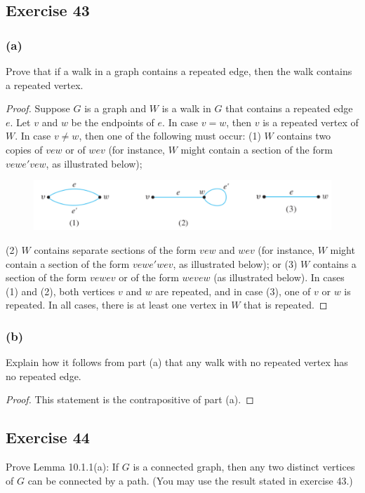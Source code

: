 \documentclass[14pt]{extarticle}
\begin{document}
\subsection{Exercise 43}
\subsubsection{(a)}
Prove that if a walk in a graph contains a repeated edge, then the walk contains a repeated vertex.

\begin{proof}
Suppose \(G\) is a graph and \(W\) is a walk in \(G\) that contains a repeated edge \(e\). Let \(v\) and \(w\) be the 
endpoints of \(e\). In case \(v = w\), then \(v\) is a repeated vertex of \(W\). In case \(v \neq w\), then one of 
the following must occur: (1) \(W\) contains two copies of \(vew\) or of \(wev\) (for instance, \(W\) might contain a 
section of the form \(vewe'vew\), as illustrated below); 

\begin{figure}[ht!]
\centering
\includegraphics[scale=0.35]{../images/10.1.43.a.png}
\end{figure}

(2) \(W\) contains separate sections of the form \(vew\) and 
\(wev\) (for instance, \(W\) might contain a section of the form \(vewe'wev\), as illustrated below); or (3) \(W\) 
contains a section of the form \(vewev\) or of the form \(wevew\) (as illustrated below). In cases (1) and (2), both 
vertices \(v\) and \(w\) are repeated, and in case (3), one of \(v\) or \(w\) is repeated. In all cases, there is at least 
one vertex in \(W\) that is repeated.
\end{proof}

\subsubsection{(b)}
Explain how it follows from part (a) that any walk with no repeated vertex has no repeated edge.

\begin{proof}
This statement is the contrapositive of part (a).
\end{proof}

\subsection{Exercise 44}
Prove Lemma 10.1.1(a): If \(G\) is a connected graph, then any two distinct vertices of \(G\) can be connected by a path. 
(You may use the result stated in exercise 43.)
\end{document}
